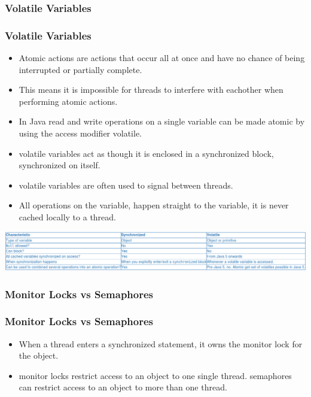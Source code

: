 \documentclass{beamer}
\begin{document}
\subsubsection{Volatile Variables}
\begin{frame}
\frametitle{Volatile Variables}
\begin{itemize}
\item {\color{red} Atomic} actions are actions that occur all at once and have no chance of being interrupted or partially complete.
\item This means it is impossible for {\color{green} threads} to interfere with eachother when performing {\color{red} atomic} actions.
\item In Java read and write operations on a single variable can be made {\color{red} atomic} by using the access modifier {\color{blue} volatile}.
\item {\color{blue} volatile} variables act as though it is enclosed in a {\color{orange} synchronized} block, {\color{orange} synchronized} on itself.
\item {\color{blue} volatile} variables are often used to signal between {\color{green} threads}.
\item All operations on the variable, happen straight to the variable, it is never cached locally to a thread.
\end{itemize}  
\includegraphics[width = \textwidth]{volvssync.png}
\end{frame}
\subsubsection{Monitor Locks vs Semaphores}
\begin{frame}
\frametitle{Monitor Locks vs Semaphores}
\begin{itemize}
\item When a {\color{green} thread} enters a {\color{red} synchronized} statement, it owns the {\color{orange} monitor lock} for the object.
\item {\color{orange} monitor locks} restrict access to an object to one single thread. {\color{purple} semaphores} can restrict access to an object to more than one thread.
\end{itemize}
\end{frame}
\end{document}

